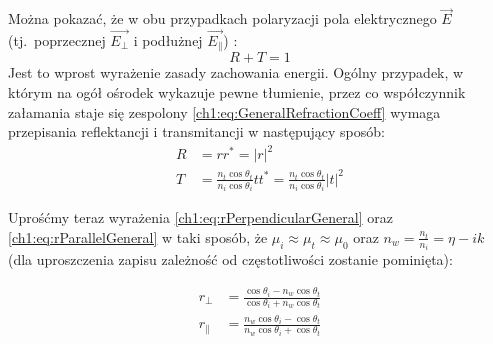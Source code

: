 Można pokazać, że w obu przypadkach polaryzacji pola elektrycznego $\vec{E}$ (tj.~poprzecznej $\vec{E_\perp}$ i podłużnej $\vec{E_\parallel}$) :
\begin{equation}
R + T = 1
\end{equation}
Jest to wprost wyrażenie zasady zachowania energii.
Ogólny przypadek, w którym na ogół ośrodek wykazuje pewne tłumienie, przez co współczynnik załamania staje się zespolony \eqref{ch1:eq:GeneralRefractionCoeff} wymaga przepisania reflektancji i transmitancji w następujący sposób:
\begin{align}
\label{ch1:eq:ReflectanceGeneral}
R &= rr^* = |r|^2\\
\label{ch1:eq:TransmitanceGeneral}
T &= \frac{n_t\cos\theta_t}{n_i\cos\theta_i}tt^* = \frac{n_t\cos\theta_t}{n_i\cos\theta_i}|t|^2
\end{align}

Uprośćmy teraz wyrażenia \eqref{ch1:eq:rPerpendicularGeneral} oraz \eqref{ch1:eq:rParallelGeneral} w taki sposób, że $\mu_i \approx \mu_t \approx \mu_0$ oraz $n_w = \frac{n_t}{n_i}=\eta - ik$ (dla uproszczenia zapisu zależność od częstotliwości zostanie pominięta):

\begin{align}
r_\perp &= \frac{\cos\theta_i - n_w\cos\theta_t}{\cos\theta_i + n_w\cos\theta_t}\\
r_\parallel &= \frac{n_w\cos\theta_i - \cos\theta_t}{n_w\cos\theta_i + \cos\theta_t}
\end{align}

